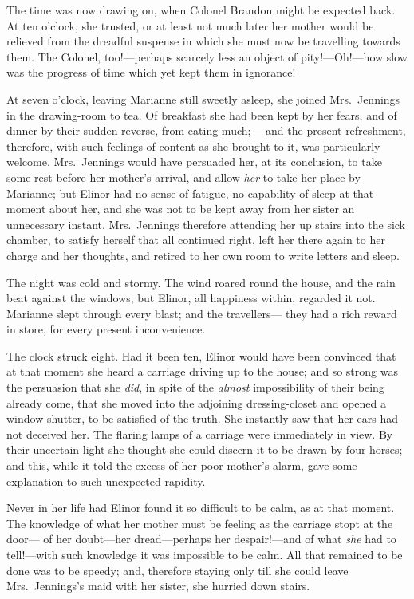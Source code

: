 \documentclass{article}
\begin{document}
The time was now drawing on, when Colonel Brandon
might be expected back.  At ten o'clock, she trusted,
or at least not much later her mother would be relieved
from the dreadful suspense in which she must now be
travelling towards them.  The Colonel, too!---perhaps scarcely
less an object of pity!---Oh!---how slow was the progress
of time which yet kept them in ignorance!

At seven o'clock, leaving Marianne still sweetly asleep,
she joined Mrs.\ Jennings in the drawing-room to tea.
Of breakfast she had been kept by her fears, and of
dinner by their sudden reverse, from eating much;---%
and the present refreshment, therefore, with such feelings
of content as she brought to it, was particularly welcome.
Mrs.\ Jennings would have persuaded her, at its conclusion,
to take some rest before her mother's arrival, and allow \emph{her} to
take her place by Marianne; but Elinor had no sense of fatigue,
no capability of sleep at that moment about her, and she was
not to be kept away from her sister an unnecessary instant.
Mrs.\ Jennings therefore attending her up stairs into the
sick chamber, to satisfy herself that all continued right,
left her there again to her charge and her thoughts,
and retired to her own room to write letters and sleep.

The night was cold and stormy.  The wind roared
round the house, and the rain beat against the windows;
but Elinor, all happiness within, regarded it not.
Marianne slept through every blast; and the travellers---%
they had a rich reward in store, for every present inconvenience.

The clock struck eight.  Had it been ten,
Elinor would have been convinced that at that moment
she heard a carriage driving up to the house;
and so strong was the persuasion that she \emph{did}, in spite
of the \emph{almost} impossibility of their being already come,
that she moved into the adjoining dressing-closet and
opened a window shutter, to be satisfied of the truth.
She instantly saw that her ears had not deceived her.
The flaring lamps of a carriage were immediately in view.
By their uncertain light she thought she could discern it
to be drawn by four horses; and this, while it told the
excess of her poor mother's alarm, gave some explanation
to such unexpected rapidity.

Never in her life had Elinor found it so difficult
to be calm, as at that moment.  The knowledge of what her
mother must be feeling as the carriage stopt at the door---%
of her doubt---her dread---perhaps her despair!---and
of what \emph{she} had to tell!---with such knowledge it was
impossible to be calm.  All that remained to be done
was to be speedy; and, therefore staying only till
she could leave Mrs.\ Jennings's maid with her sister,
she hurried down stairs.
\end{document}
